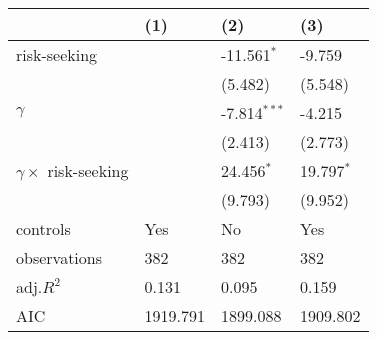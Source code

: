 \begin{tabular}{llll}
\hline
 & (1) & (2) & (3) \\
\hline
risk-seeking &  & -11.561$^{*}$ & -9.759 \\
 &  & (5.482) & (5.548) \\
$\gamma$ &  & -7.814$^{***}$ & -4.215 \\
 &  & (2.413) & (2.773) \\
$\gamma \times$ risk-seeking &  & 24.456$^{*}$ & 19.797$^{*}$ \\
 &  & (9.793) & (9.952) \\
controls & Yes & No & Yes \\
observations & 382 & 382 & 382 \\
adj.$R^2$ & 0.131 & 0.095 & 0.159 \\
AIC & 1919.791 & 1899.088 & 1909.802 \\
\hline
\end{tabular}

